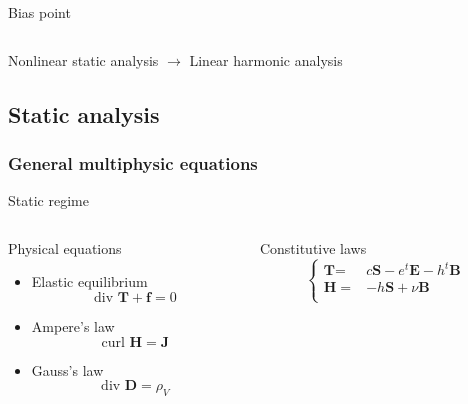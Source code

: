 \documentclass[compress]{beamer}
\begin{document}
\begin{frame}
\begin{columns}[totalwidth=\textwidth]
\begin{column}{.55\textwidth}
	Bias point
	\end{column}
\end{columns}
\vspace{0.5cm}
\begin{exampleblock}{} 
  \centering
  Nonlinear static analysis {\color{red} \Large$\mathbf{\boldsymbol{\rightarrow}}$} Linear harmonic analysis
\end{exampleblock}	
\end{frame}

\subsection{Static analysis}
\begin{frame}\frametitle{General multiphysic equations}
Static regime
\begin{columns}[totalwidth=\textwidth] 
   \begin{column}{.5\textwidth}
   \begin{exampleblock}{Physical equations} 
   \begin{itemize}[label=$\bullet$, font=\small, leftmargin=*]
	\item Elastic equilibrium 
	\begin{equation*}
	\text{div }\boldsymbol{T} + \boldsymbol{f} = 0
	\end{equation*}
	\item Ampere's law
	\begin{equation*}
	\text{curl }\boldsymbol{H} = \boldsymbol{J}
	\end{equation*}
	\item Gauss's law
	\begin{equation*}
	\text{div }\boldsymbol{D} = \rho_V
	\end{equation*}
	\end{itemize}
	\end{exampleblock}	
	\end{column}
	\begin{column}{.45\textwidth}
	\begin{exampleblock}{Constitutive laws} \vspace*{-\baselineskip}
	\begin{equation*}
				\left\{ 
				\begin{aligned}
				\textbf{T} = & c \boldsymbol{S} - e^t \boldsymbol{E} - h^t \boldsymbol{B} \\
				\boldsymbol{H} = & - h \boldsymbol{S} + \nu \boldsymbol{B} \\

\end{aligned}
\end{equation*}
\end{exampleblock}
\end{column}
\end{columns}
\end{frame}
\end{document}
